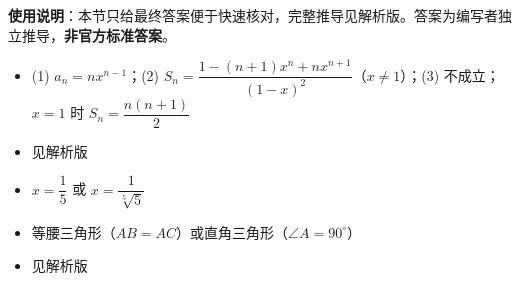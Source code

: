 
\begin{gknotice}
\textbf{使用说明}：本节只给最终答案便于快速核对，完整推导见解析版。答案为编写者独立推导，\textbf{非官方标准答案}。
\end{gknotice}

\begin{itemize}[leftmargin=2.6em]
  \item[\textbf{1.}] (1) $a_n=nx^{n-1}$；(2) $S_n=\dfrac{1-(n+1)x^n+nx^{n+1}}{(1-x)^2}$（$x\neq1$）；(3) 不成立；$x=1$ 时 $S_n=\dfrac{n(n+1)}2$
  \item[\textbf{2.}] 见解析版
  \item[\textbf{3.}] $x=\dfrac15$ 或 $x=\dfrac1{\sqrt[5]5}$
  \item[\textbf{4.}] 等腰三角形（$AB=AC$）或直角三角形（$\angle A=90^\circ$）
  \item[\textbf{5.}] 见解析版
\end{itemize}
